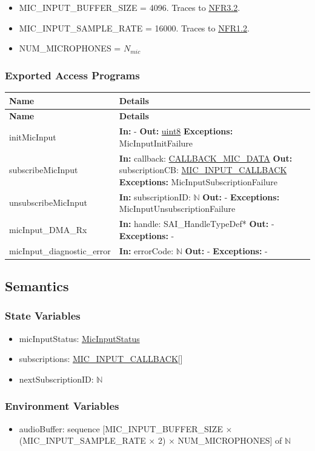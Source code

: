 \documentclass[12pt, titlepage]{article}
\newenvironment{apitable}{%
\begin{center}
\begin{longtable}{|p{0.3\linewidth}|p{0.7\linewidth}|} 
\hline
\textbf{Name} & \textbf{Details} \\
\hline
\endfirsthead
\hline
\textbf{Name} & \textbf{Details} \\
\hline
\endhead
\hline
\endfoot
\hline
\endlastfoot
}{%
\end{longtable}
\end{center}
}
\newcommand{\apifunc}[4]{%
#1 & 
\textbf{In:} #2 \newline
\textbf{Out:} #3 \newline
\textbf{Exceptions:} #4 \\
\hline
}
\begin{document}
\begin{itemize}
  \item MIC\_INPUT\_BUFFER\_SIZE = 4096. Traces to
    \hyperref[SRS-NFR3_2]{NFR3.2}.
  \item MIC\_INPUT\_SAMPLE\_RATE = 16000. Traces to
    \hyperref[SRS-NFR1_2]{NFR1.2}.
  \item NUM\_MICROPHONES = \hyperref[SRS-symbol:N_mic]{$N_{mic}$}
\end{itemize}

\subsubsection{Exported Access Programs}

\begin{apitable}
  \apifunc{initMicInput}
    {-}
    {\hyperref[generic:uint8]{uint8}}
    {MicInputInitFailure}
  \apifunc{subscribeMicInput}
    {callback: \hyperref[ds:cb-mic-data]{CALLBACK\_MIC\_DATA}}
    {subscriptionCB: \hyperref[ds:mic-input-callback]{MIC\_INPUT\_CALLBACK}}
    {MicInputSubscriptionFailure}
  \apifunc{unsubscribeMicInput}
    {subscriptionID: \(\mathbb{N}\)}
    {-}
    {MicInputUnsubscriptionFailure}
  \apifunc{micInput\_DMA\_Rx}{handle: SAI\_HandleTypeDef*}{-}{-}
  \apifunc{micInput\_diagnostic\_error}{errorCode: \(\mathbb{N}\)}{-}{-}
\end{apitable}


\subsection{Semantics}

\subsubsection{State Variables}
\begin{itemize}
  \item micInputStatus: \hyperref[enum:MicInputStatus]{MicInputStatus}
  \item subscriptions:
  \hyperref[ds:mic-input-callback]{MIC\_INPUT\_CALLBACK}[]
  \item nextSubscriptionID: \(\mathbb{N}\)
\end{itemize}

\subsubsection{Environment Variables}
\begin{itemize}
  \item audioBuffer: sequence [MIC\_INPUT\_BUFFER\_SIZE \(\times\)
  (MIC\_INPUT\_SAMPLE\_RATE \(\times\) 2) \(\times\) NUM\_MICROPHONES] of
  \(\mathbb{N}\) 
\end{itemize}
\end{document}
